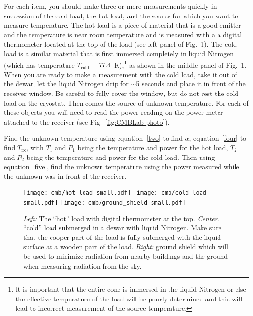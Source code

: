 For each item, you should make three or more measurements quickly in succession of the cold load, the hot load, and the source for which you want to measure temperature. The hot load is a piece of material that is a good emitter and the temperature is near room temperature and is measured with a a digital thermometer located at the top of the load (see left panel of Fig.~\ref{fig:details}). The cold load is a similar material that is first immersed completely in liquid Nitrogen (which has temperature $T_\textrm{cold}=77.4$~K),\footnote{It is important that the entire cone is immersed in the liquid Nitrogen or else the effective temperature of the load will be poorly determined and this will lead to incorrect measurement of the source temperature.} as shown in the middle panel of Fig.~\ref{fig:details}. When you are ready to make a measurement with the cold load, take it out of the dewar, let the liquid Nitrogen drip for $\sim$5 seconds and place it in front of the receiver window. Be careful to fully cover the window, but do not rest the cold load on the cryostat. Then comes the source of unknown temperature. For each of these objects you will need to read the power reading on the power meter attached to the receiver (see Fig.~\ref{fig:CMBLab-photo}).

Find the unknown temperature using equation~\ref{two} to find $\alpha$, equation~\ref{four} to find $T_\textrm{rx}$, with $T_1$ and $P_1$ being the temperature and power for the hot load, $T_2$ and $P_2$ being the temperature and power for the cold load. Then using equation~\ref{five}, find the unknown temperature using the power measured while the unknown was in front of the receiver.

\begin{figure}[ht!]
	\begin{center}
		\texttt{[image: cmb/hot\_load-small.pdf]}
		\texttt{[image: cmb/cold\_load-small.pdf]}
		\texttt{[image: cmb/ground\_shield-small.pdf]}
		\caption{\textit{Left:} The ``hot'' load with digital thermometer at the top. \textit{Center:} ``cold'' load submerged in a dewar with liquid Nitrogen. Make sure that the cooper part of the load is fully submerged with the liquid surface at a wooden part of the load. \textit{Right:} ground shield which will be used to minimize radiation from nearby buildings  and the ground when measuring radiation from the sky. } 
		\label{fig:details}
	\end{center}
\end{figure}

